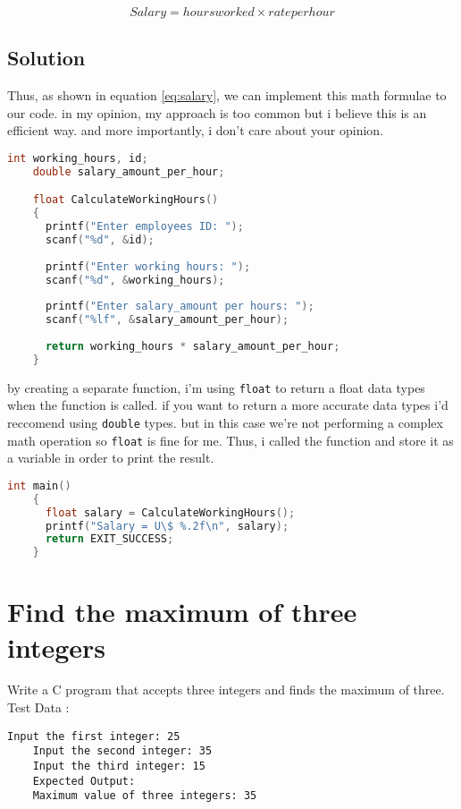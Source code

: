 \documentclass{article}
\begin{document}
  \begin{equation}
  Salary = hoursworked \times rateperhour
  \label{eq:salary}
  \end{equation}

  \subsection{Solution}

  Thus, as shown in equation \ref{eq:salary}, we can implement this math formulae to our code. in my opinion, my approach is too common but i believe this is an efficient way. and more importantly, i don't care about your opinion.
  \begin{lstlisting}[language=C, caption=Code Implementation]
    int working_hours, id;
    double salary_amount_per_hour;

    float CalculateWorkingHours()
    {
      printf("Enter employees ID: ");
      scanf("%d", &id);
      
      printf("Enter working hours: ");
      scanf("%d", &working_hours);
    
      printf("Enter salary_amount per hours: ");
      scanf("%lf", &salary_amount_per_hour);
    
      return working_hours * salary_amount_per_hour;
    }
  \end{lstlisting}
  by creating a separate function, i'm using \texttt{float} to return a float data types when the function is called. if you want to return a more accurate data types
  i'd reccomend using \texttt{double} types. but in this case we're not performing a complex math operation so \texttt{float} is fine for me.
  Thus, i called the function and store it as a variable in order to print the result. 
  \begin{lstlisting}[language=C, caption=Call the function]
    int main()
    {
      float salary = CalculateWorkingHours();
      printf("Salary = U\$ %.2f\n", salary);
      return EXIT_SUCCESS;
    }
  \end{lstlisting}

  \section{Find the maximum of three integers}
  
  Write a C program that accepts three integers and finds the maximum of three. Test Data :
  
  \begin{lstlisting}[style=plainstyle]
    Input the first integer: 25
    Input the second integer: 35
    Input the third integer: 15
    Expected Output:
    Maximum value of three integers: 35 
  \end{lstlisting}
\end{document}
